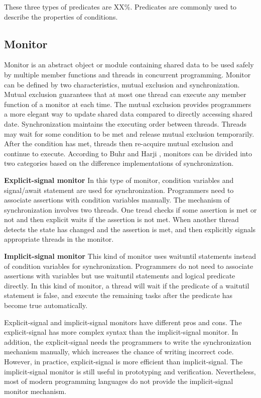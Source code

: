 \documentclass[preprint]{sigplanconf}
\begin{document}
These three types of predicates are XX\%. 
Predicates are commonly used to describe the properties of conditions. 

\subsection{Monitor}
Monitor is an abstract object or module containing shared data to be used safely
by multiple member functions and threads in concurrent programming. Monitor can
be defined by two characteristics, mutual exclusion and synchronization. Mutual 
exclusion guarantees that at most one thread can execute any member function of 
a monitor at each time. The mutual exclusion provides programmers a more elegant
way to update shared data compared to directly accessing shared date. 
Synchronization maintains the executing order between threads. Threads may wait
for some condition to be met and release mutual exclusion temporarily. After the
condition has met, threads then re-acquire mutual exclusion and continue to 
execute.
According to Buhr and Harji \cite{bh05}, monitors can be divided into two 
categories based on the difference implementations of synchronization. 
\begin{description}
    \item{\bf Explicit-signal monitor} In this type of monitor, condition
    variables and signal/await statement are used for synchronization. 
    Programmers need to
    associate assertions with condition variables manually. The mechanism of
    synchronization involves two threads. One tread checks if some
    assertion is met or not and then explicit waits if the assertion is not
    met. When another thread detects the state has changed and the assertion is
    met, and then explicitly signals appropriate threads in the monitor.
    \item{\bf Implicit-signal monitor} This kind of monitor uses waituntil
    statements instead of condition variables for
    synchronization. Programmers do not need to associate assertions with
    variables but use waituntil statements and logical predicate directly. In
    this kind of monitor, a thread will wait if the predicate of a waitutil
    statement is false, and execute the remaining tasks after the predicate
    has become true automatically.
\end{description}

Explicit-signal and implicit-signal monitors have different pros and cons. The 
explicit-signal has more complex syntax than the implicit-signal monitor. In 
addition, the explicit-signal needs the programmers to write the synchronization
mechanism manually, which increases the chance of writing incorrect code. 
However, in practice, explicit-signal is more efficient than implicit-signal. 
The implicit-signal monitor is still useful in prototyping and verification. 
Nevertheless, most of modern programming languages do not provide the 
implicit-signal monitor mechanism.
\end{document}
